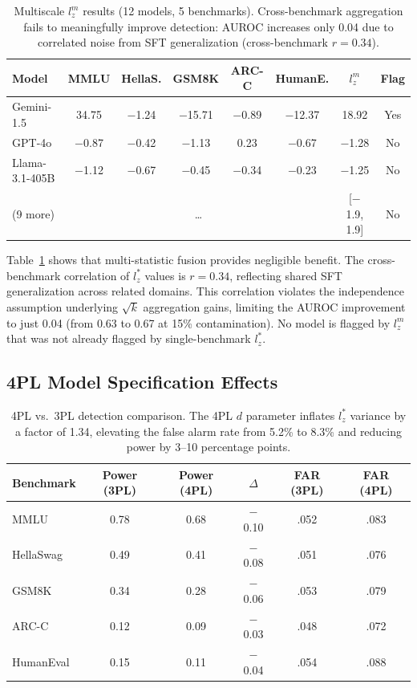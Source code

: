 \documentclass[11pt,a4paper]{article}
\newcommand{\lzstar}{$l_{z}^{*}$}
\newcommand{\lzm}{$l_{z}^{m}$}
\begin{document}
\begin{table}[t]
\centering
\caption{Multiscale \lzm{} results (12 models, 5 benchmarks). Cross-benchmark aggregation fails to meaningfully improve detection: AUROC increases only 0.04 due to correlated noise from SFT generalization (cross-benchmark $r = 0.34$).}
\label{tab:lzm}
\small
\begin{tabular}{@{}lccccccc@{}}
\toprule
Model & MMLU & HellaS. & GSM8K & ARC-C & HumanE. & \lzm{} & Flag \\
\midrule
Gemini-1.5 & 34.75 & $-$1.24 & $-$15.71 & $-$0.89 & $-$12.37 & 18.92 & Yes \\
GPT-4o & $-$0.87 & $-$0.42 & $-$1.13 & 0.23 & $-$0.67 & $-$1.28 & No \\
Llama-3.1-405B & $-$1.12 & $-$0.67 & $-$0.45 & $-$0.34 & $-$0.23 & $-$1.25 & No \\
(9 more) & \multicolumn{5}{c}{\ldots} & [$-$1.9, 1.9] & No \\
\bottomrule
\end{tabular}
\end{table}

Table~\ref{tab:lzm} shows that multi-statistic fusion provides negligible benefit. The cross-benchmark correlation of \lzstar{} values is $r = 0.34$, reflecting shared SFT generalization across related domains. This correlation violates the independence assumption underlying $\sqrt{k}$ aggregation gains, limiting the AUROC improvement to just 0.04 (from 0.63 to 0.67 at 15\% contamination). No model is flagged by \lzm{} that was not already flagged by single-benchmark \lzstar{}.

\subsection{4PL Model Specification Effects}
\label{sec:4pl}

\begin{table}[t]
\centering
\caption{4PL vs.\ 3PL detection comparison. The 4PL $d$ parameter inflates \lzstar{} variance by a factor of 1.34, elevating the false alarm rate from 5.2\% to 8.3\% and reducing power by 3--10 percentage points.}
\label{tab:4pl_vs_3pl}
\small
\begin{tabular}{@{}lccccc@{}}
\toprule
Benchmark & Power (3PL) & Power (4PL) & $\Delta$ & FAR (3PL) & FAR (4PL) \\
\midrule
MMLU & 0.78 & 0.68 & $-$0.10 & .052 & .083 \\
HellaSwag & 0.49 & 0.41 & $-$0.08 & .051 & .076 \\
GSM8K & 0.34 & 0.28 & $-$0.06 & .053 & .079 \\
ARC-C & 0.12 & 0.09 & $-$0.03 & .048 & .072 \\
HumanEval & 0.15 & 0.11 & $-$0.04 & .054 & .088 \\
\bottomrule
\end{tabular}
\end{table}
\end{document}
